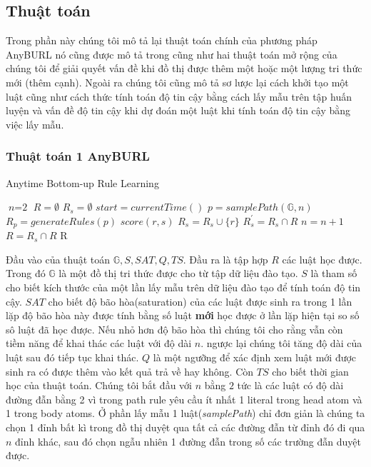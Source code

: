 \subsection{Thuật toán} \label{algorithm2}
Trong phần này chúng tôi mô tả lại thuật toán chính của phương pháp AnyBURL nó cũng được mô tả trong \cite{burl} cũng như hai thuật toán mở rộng của chúng tôi để giải quyết vấn đề khi đồ thị được thêm một hoặc một lượng tri thức mới (thêm cạnh). Ngoài ra chúng tôi cũng mô tả sơ lược lại cách khởi tạo một luật cũng như cách thức tính toán độ tin cậy bằng cách lấy mẫu trên tập huấn luyện và vấn đề độ tin cậy khi dự đoán một luật khi tính toán độ tin cậy bằng việc lấy mẫu.
\subsubsection{Thuật toán 1 AnyBURL}
\begin{algorithm}
\caption{Anytime Bottom-up Rule Learning}\label{euclid}
\begin{algorithmic}[1]
\State $\textit{n} = \text{2}$
\State $R = \emptyset$
\Loop
\State $R_s = \emptyset$
\State $start = currentTime()$
\Repeat
\State $p = samplePath(\mathbb{G}, n)$
\State $R_p = generateRules(p)$
\State $score(r, s)$
	\State $R_s = R_s \cup \{r\}$
\EndIf
\EndFor
{}
\State $R^{\prime}_s = R_s \cap R$
	\State $n = n + 1$
\EndIf
\State $R = R_s \cap R$
\EndLoop
\Return R
\EndProcedure
\end{algorithmic}
\end{algorithm}

Đầu vào của thuật toán \(\mathbb{G}, S, SAT, Q, TS\). Đầu ra là tập hợp \(R\) các luật học được. Trong đó \(\mathbb{G}\) là một đồ thị tri thức được cho từ tập dữ liệu đào tạo. \(S\) là tham số cho biết kích thước của một lần lấy mẫu trên dữ liệu đào tạo để tính toán độ tin cậy. \(SAT\) cho biết độ bão hòa(saturation) của các luật được sinh ra trong 1 lần lặp độ bão hòa này được tính bằng số luật \textbf{mới} học được ở lần lặp hiện tại so số sô luật đã học được. Nếu nhỏ hơn độ bão hòa thì chúng tôi cho rằng vẫn còn tiềm năng để khai thác các luật với độ dài \(n\). ngược lại chúng tôi tăng độ dài của luật sau đó tiếp tục khai thác. \(Q\) là một ngưỡng để xác định xem luật mới được sinh ra có được thêm vào kết quả trả về hay không. Còn \(TS\) cho biết thời gian học của thuật toán. Chúng tôi bắt đầu với \(n\) bằng \(2\) tức là các luật có độ dài đường đẫn bằng 2 vì trong path rule yêu cầu ít nhất 1 literal trong head atom và 1 trong body atoms. Ở phần lấy mẫu 1 luật(\textit{samplePath}) chỉ đơn giản là chúng ta chọn 1 đỉnh bất kì trong đồ thị duyệt qua tất cả các đường đẫn từ đỉnh đó đi qua \(n\) đỉnh khác, sau đó chọn ngẫu nhiên 1 đường đẫn trong số các trường đẫn duyệt được.

